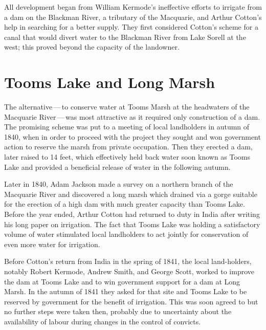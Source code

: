 All development began from William Kermode's
ineffective efforts to irrigate from a dam on the Blackman River, a
tributary of the Macquarie, and Arthur Cotton's help in searching for
a better supply.  They first considered Cotton's scheme for a canal
that would divert water to the Blackman River
from Lake Sorell at the west; this proved beyond
the capacity of the landowner.

\section*{Tooms Lake and Long Marsh}

The alternative\,---\,to conserve water at Tooms Marsh at the
headwaters of the Macquarie River\,---\,was
most attractive as it required only construction of a dam.  The
promising scheme was put to a meeting of local landholders in autumn
of 1840, when in order to proceed with the project they sought and won
government action to reserve the marsh from private occupation.  Then
they erected a dam, later raised to 14 feet, which effectively held
back water soon known as Tooms Lake and provided a beneficial release
of water in the following autumn.

Later in 1840, Adam Jackson  made a survey on a
northern branch of the Macquarie River and discovered a long marsh
which drained via a gorge suitable for the erection of a high dam with
much greater capacity than Tooms Lake.  Before the year ended, Arthur
Cotton  had returned to duty in India after writing
his long paper on irrigation.  The fact that Tooms Lake was holding a
satisfactory volume of water stimulated local landholders to act
jointly for conservation of even more water for irrigation.

Before Cotton's return from India in the spring of 1841, the local
land-holders, notably Robert Kermode,  Andrew
Smith,  and George Scott,  worked to
improve the dam at Tooms Lake and to win government support for a dam
at Long Marsh.  In the autumn of 1841 they asked for that site and
Tooms Lake to be reserved by government for the benefit of irrigation.
This was soon agreed to but no further steps were taken then, probably
due to uncertainty about the availability of labour during changes in
the control of convicts.

